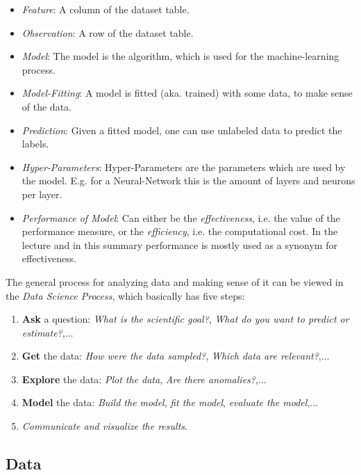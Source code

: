 \documentclass[12pt,a4paper]{article}
\begin{document}
\begin{itemize}
    \item \textit{Feature}: A column of the dataset table.
    \item \textit{Observation}: A row of the dataset table.
    \item \textit{Model}: The model is the algorithm, which is used for the machine-learning process.
    \item \textit{Model-Fitting}: A model is fitted (aka. trained) with some data, to make sense of the data.
    \item \textit{Prediction}: Given a fitted model, one can use unlabeled data to predict the labels.
    \item \textit{Hyper-Parameters}: Hyper-Parameters are the parameters which are used by the model. E.g. for a Neural-Network this is the amount of layers and neurons per layer.
    \item \textit{Performance of Model}: Can either be the \textit{effectiveness}, i.e. the value of the performance measure, or the \textit{efficiency}, i.e. the computational cost. In the lecture and in this summary performance is mostly used as a synonym for effectiveness.
\end{itemize}

\noindent The general process for analyzing data and making sense of it can be viewed in the \textit{Data Science Process}, which basically has five steps:

\begin{enumerate}
    \item \textbf{Ask} a question: \textit{What is the scientific goal?}, \textit{What do you want to predict or estimate?},...
    \item \textbf{Get} the data: \textit{How were the data sampled?}, \textit{Which data are relevant?},...
    \item \textbf{Explore} the data: \textit{Plot the data}, \textit{Are there anomalies?},...
    \item \textbf{Model} the data: \textit{Build the model}, \textit{fit the model}, \textit{evaluate the model},...
    \item \textit{Communicate and visualize the results}.

\end{enumerate}

\subsection{Data}
\end{document}
